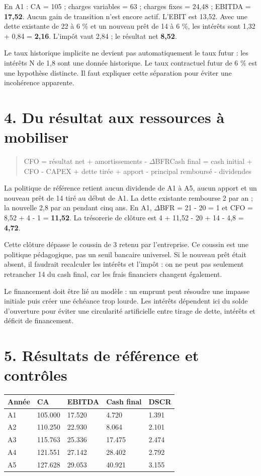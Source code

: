 \documentclass[12pt,a4paper]{article}
\begin{document}
En A1 : CA = 105 ; charges variables = 63 ; charges fixes = 24,48 ; EBITDA = \textbf{17,52}. Aucun gain de transition n’est encore actif. L’EBIT est 13,52. Avec une dette existante de 22 à 6 \% et un nouveau prêt de 14 à 6 \%, les intérêts sont 1,32 + 0,84 = \textbf{2,16}. L’impôt vaut 2,84 ; le résultat net \textbf{8,52}.


Le taux historique implicite ne devient pas automatiquement le taux futur : les intérêts N de 1,8 sont une donnée historique. Le taux contractuel futur de 6 \% est une hypothèse distincte. Il faut expliquer cette séparation pour éviter une incohérence apparente.

\section*{4. Du résultat aux ressources à mobiliser}

\begin{quote}\small CFO = résultat net + amortissements - $\Delta$BFR\newline Cash final = cash initial + CFO - CAPEX + dette tirée + apport - principal remboursé - dividendes\end{quote}

La politique de référence retient aucun dividende de A1 à A5, aucun apport et un nouveau prêt de 14 tiré au début de A1. La dette existante rembourse 2 par an ; la nouvelle 2,8 par an pendant cinq ans. En A1, $\Delta$BFR = 21 - 20 = 1 et CFO = 8,52 + 4 - 1 = \textbf{11,52}. La trésorerie de clôture est 4 + 11,52 - 20 + 14 - 4,8 = \textbf{4,72}.


Cette clôture dépasse le coussin de 3 retenu par l’entreprise. Ce coussin est une politique pédagogique, pas un seuil bancaire universel. Si le nouveau prêt était absent, il faudrait recalculer les intérêts et l’impôt : on ne peut pas seulement retrancher 14 du cash final, car les frais financiers changent également.


Le financement doit être lié au modèle : un emprunt peut résoudre une impasse initiale puis créer une échéance trop lourde. Les intérêts dépendent ici du solde d’ouverture pour éviter une circularité artificielle entre tirage de dette, intérêts et déficit de financement.

\section*{5. Résultats de référence et contrôles}

\Needspace{250pt}
\begin{longtable}{p{2.84cm}p{2.84cm}p{2.84cm}p{2.84cm}p{2.84cm}}
\toprule
Année & CA & EBITDA & Cash final & DSCR \\
\midrule\endhead
A1 & 105.000 & 17.520 & 4.720 & 1.391 \\
A2 & 110.250 & 22.930 & 8.064 & 2.101 \\
A3 & 115.763 & 25.336 & 17.475 & 2.474 \\
A4 & 121.551 & 27.142 & 28.402 & 2.792 \\
A5 & 127.628 & 29.053 & 40.921 & 3.155 \\
\bottomrule
\end{longtable}
\end{document}
